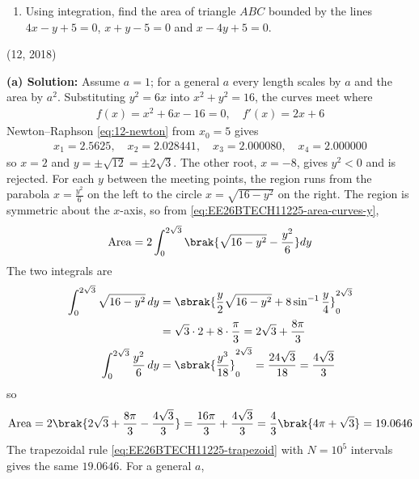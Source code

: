 \begin{enumerate}[label=\thesubsection.\arabic*, ref=\thesubsection.\theenumi]
\begin{enumerate}[label=(\alph*), leftmargin=1.5em, labelsep=0.5em]
        \begin{center}
            \textbf{OR}
        \end{center}

        \item Using integration, find the area of triangle $ABC$ bounded by the lines $4x-y+5=0$, $x+y-5=0$ and $x-4y+5=0$.
    \end{enumerate} \vspace{2pt}

\par\hfill (12, 2018)\par
\textbf{(a) Solution:} Assume $a = 1$; for a general $a$ every length scales by $a$ and the area by $a^2$. Substituting $y^2 = 6x$ into $x^2 + y^2 = 16$, the curves meet where
\begin{align}
f(x) = x^2 + 6x - 16 = 0, \quad f'(x) = 2x + 6
\end{align}
Newton--Raphson \eqref{eq:12-newton} from $x_0 = 5$ gives
\begin{align*}
x_1 = 2.5625, \quad x_2 = 2.028441, \quad x_3 = 2.000080, \quad x_4 = 2.000000
\end{align*}
so $x = 2$ and $y = \pm\sqrt{12} = \pm 2\sqrt{3}$. The other root, $x = -8$, gives $y^2 < 0$ and is rejected. For each $y$ between the meeting points, the region runs from the parabola $x = \frac{y^2}{6}$ on the left to the circle $x = \sqrt{16 - y^2}$ on the right. The region is symmetric about the $x$-axis, so from \eqref{eq:EE26BTECH11225-area-curves-y},
\begin{align}
\text{Area} = 2\int_0^{2\sqrt{3}}\brak{\sqrt{16 - y^2} - \frac{y^2}{6}}dy
\end{align}
The two integrals are
\begin{align*}
\int_0^{2\sqrt{3}}\sqrt{16 - y^2}\,dy &= \sbrak{\frac{y}{2}\sqrt{16 - y^2} + 8\sin^{-1}\frac{y}{4}}_0^{2\sqrt{3}} \\
&= \sqrt{3}\cdot 2 + 8\cdot\frac{\pi}{3} = 2\sqrt{3} + \frac{8\pi}{3} \\
\int_0^{2\sqrt{3}}\frac{y^2}{6}\,dy &= \sbrak{\frac{y^3}{18}}_0^{2\sqrt{3}} = \frac{24\sqrt{3}}{18} = \frac{4\sqrt{3}}{3}
\end{align*}
so
\begin{align*}
\text{Area} = 2\brak{2\sqrt{3} + \frac{8\pi}{3} - \frac{4\sqrt{3}}{3}} = \frac{16\pi}{3} + \frac{4\sqrt{3}}{3} = \frac{4}{3}\brak{4\pi + \sqrt{3}} = 19.0646
\end{align*}
The trapezoidal rule \eqref{eq:EE26BTECH11225-trapezoid} with $N = 10^5$ intervals gives the same $19.0646$. For a general $a$,

\end{enumerate}

